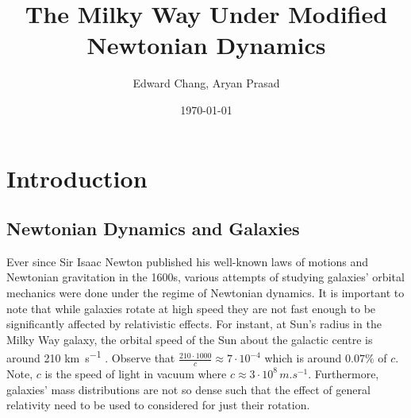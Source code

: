 \documentclass[11pt, twocolumn]{article}
\title{{\myfont \textbf{The Milky Way Under Modified Newtonian Dynamics}}}
\author{{Edward Chang, Aryan Prasad}}
\date{\today}
\begin{document}
	\section*{Introduction}
	\subsection*{Newtonian Dynamics and Galaxies}
	Ever since Sir Isaac Newton published his well-known laws of motions and Newtonian gravitation in the 1600s, various attempts of studying galaxies' orbital mechanics were done under the regime of Newtonian dynamics. It is important to note that while galaxies rotate at high speed they are not fast enough to be significantly affected by relativistic effects. For instant, at Sun's radius in the Milky Way galaxy, the orbital speed of the Sun about the galactic centre is around 210 \si{km.s^{-1}} \parencite{noauthor_super_2019}.
	Observe that \( \frac{210 \cdot 1000}{c} \approx 7 \cdot 10^{-4} \) which is around \( 0.07\% \) of \( c \).
	Note, \( c \) is the speed of light in vacuum where \( c \approx 3 \cdot 10^8 \, \si{m.s^{-1}}\). Furthermore, galaxies' mass distributions are not so dense such that the effect of general relativity need to be used to considered for just their rotation.
	
\end{document}
